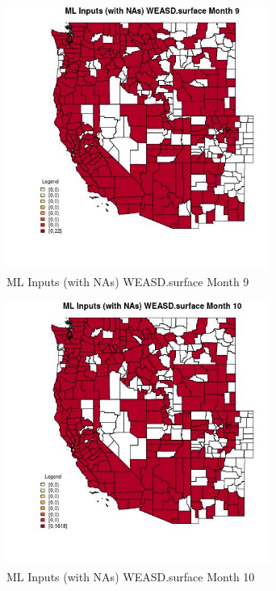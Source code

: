 \begin{figure} 
\centering  
\includegraphics[width=0.77\textwidth]{Code_Outputs/Report_ML_input_PM25_Step4_part_e_de_duplicated_aves_compiled_2019-05-21wNAs_CountyWEASDsurfacemedianMonth9.jpg} 
\caption{\label{fig:Report_ML_input_PM25_Step4_part_e_de_duplicated_aves_compiled_2019-05-21wNAsCountyWEASDsurfacemedianMonth9}ML Inputs (with NAs) WEASD.surface Month 9} 
\end{figure} 
 

\begin{figure} 
\centering  
\includegraphics[width=0.77\textwidth]{Code_Outputs/Report_ML_input_PM25_Step4_part_e_de_duplicated_aves_compiled_2019-05-21wNAs_CountyWEASDsurfacemedianMonth10.jpg} 
\caption{\label{fig:Report_ML_input_PM25_Step4_part_e_de_duplicated_aves_compiled_2019-05-21wNAsCountyWEASDsurfacemedianMonth10}ML Inputs (with NAs) WEASD.surface Month 10} 
\end{figure} 
 

